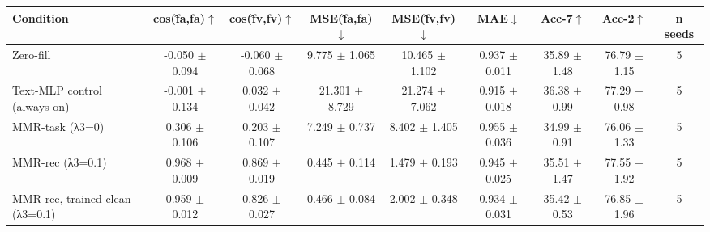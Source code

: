 \begin{tabular}{lcccccccc}
\hline
Condition & cos(f̂a,fa)$\uparrow$ & cos(f̂v,fv)$\uparrow$ & MSE(f̂a,fa)$\downarrow$ & MSE(f̂v,fv)$\downarrow$ & MAE$\downarrow$ & Acc-7$\uparrow$ & Acc-2$\uparrow$ & n seeds \\
\hline
Zero-fill & -0.050 $\pm$ 0.094 & -0.060 $\pm$ 0.068 & 9.775 $\pm$ 1.065 & 10.465 $\pm$ 1.102 & 0.937 $\pm$ 0.011 & 35.89 $\pm$ 1.48 & 76.79 $\pm$ 1.15 & 5 \\
Text-MLP control (always on) & -0.001 $\pm$ 0.134 & 0.032 $\pm$ 0.042 & 21.301 $\pm$ 8.729 & 21.274 $\pm$ 7.062 & 0.915 $\pm$ 0.018 & 36.38 $\pm$ 0.99 & 77.29 $\pm$ 0.98 & 5 \\
MMR-task (λ3=0) & 0.306 $\pm$ 0.106 & 0.203 $\pm$ 0.107 & 7.249 $\pm$ 0.737 & 8.402 $\pm$ 1.405 & 0.955 $\pm$ 0.036 & 34.99 $\pm$ 0.91 & 76.06 $\pm$ 1.33 & 5 \\
MMR-rec (λ3=0.1) & 0.968 $\pm$ 0.009 & 0.869 $\pm$ 0.019 & 0.445 $\pm$ 0.114 & 1.479 $\pm$ 0.193 & 0.945 $\pm$ 0.025 & 35.51 $\pm$ 1.47 & 77.55 $\pm$ 1.92 & 5 \\
MMR-rec, trained clean (λ3=0.1) & 0.959 $\pm$ 0.012 & 0.826 $\pm$ 0.027 & 0.466 $\pm$ 0.084 & 2.002 $\pm$ 0.348 & 0.934 $\pm$ 0.031 & 35.42 $\pm$ 0.53 & 76.85 $\pm$ 1.96 & 5 \\
\hline
\end{tabular}


